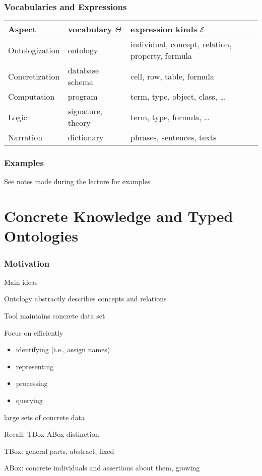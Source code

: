 \begin{frame}\frametitle{Vocabularies and Expressions}
\begin{center}
\footnotesize
\begin{tabular}{l|ll}
Aspect & vocabulary $\Theta$ & expression kinds $\mathcal{E}$ \\
\hline
Ontologization  & ontology & individual, concept, relation, property, formula \\
Concretization & database schema & cell, row, table, formula \\
Computation & program & term, type, object, class, \ldots \\
Logic & signature, theory & term, type, formula, \ldots \\
Narration & dictionary & phrases, sentences, texts \\
\end{tabular}
\end{center}
\end{frame}

\begin{frame}\frametitle{Examples}
See notes made during the lecture for examples
\end{frame}

\section{Concrete Knowledge and Typed Ontologies}

\begin{frame}\frametitle{Motivation}
\begin{blockitems}{Main ideas}
\item Ontology abstractly describes concepts and relations
\item Tool maintains concrete data set
\item Focus on efficiently
  \begin{itemize}
  \item identifying (i.e., assign names)
  \item representing
  \item processing
  \item querying
  \end{itemize}
  large sets of concrete data
\end{blockitems}

\begin{blockitems}{Recall: TBox-ABox distinction}
  \item TBox: general parts, abstract, fixed
  \item ABox: concrete individuals and assertions about them, growing
\end{blockitems}
\end{frame}


